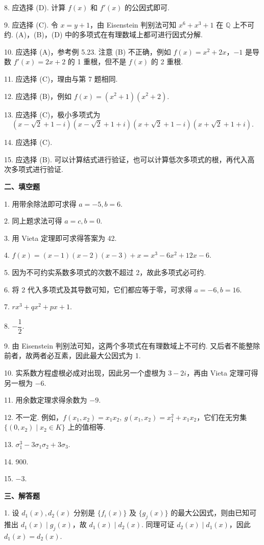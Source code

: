 \documentclass[UTF8,12pt,a4paper,fontset=fandol]{ctexart}
\begin{document}
8. 应选择 (D). 计算 $f(x)$ 和 $f'(x)$ 的公因式即可.

9. 应选择 (C). 令 $x=y+1$，由 Eisenstein 判别法可知 $x^6+x^3+1$ 在 $\mathbb{Q}$ 上不可约. (A)，(B)，(D) 中的多项式在有理数域上都可进行因式分解.

10. 应选择 (A)，参考例 5.23. 注意 (B) 不正确，例如 $f(x)=x^2+2x$，$-1$ 是导数 $f'(x)=2x+2$ 的 1 重根，但不是 $f(x)$ 的 2 重根.

11. 应选择 (C)，理由与第 7 题相同.

12. 应选择 (B)，例如 $f(x)=(x^2+1)(x^2+2)$.

13. 应选择 (C)，极小多项式为
\[
(x-\sqrt{2}+1-i)(x-\sqrt{2}+1+i)(x+\sqrt{2}+1-i)(x+\sqrt{2}+1+i).
\]

14. 应选择 (C).

15. 应选择 (B). 可以计算结式进行验证，也可以计算低次多项式的根，再代入高次多项式进行验证.

\noindent\textbf{二、填空题}

1. 用带余除法即可求得 $a=-5,b=6$.

2. 同上题求法可得 $a=c,b=0$.

3. 用 Vieta 定理即可求得答案为 42.

4. $f(x)=(x-1)(x-2)(x-3)+x=x^3-6x^2+12x-6$.

5. 因为不可约实系数多项式的次数不超过 2，故此多项式必可约.

6. 将 2 代入多项式及其导数可知，它们都应等于零，可求得 $a=-6,b=16$.

7. $rx^3+qx^2+px+1$.

8. $-\dfrac{1}{2}$.

9. 由 Eisenstein 判别法可知，这两个多项式在有理数域上不可约. 又后者不能整除前者，故两者必互素，因此最大公因式为 1.

10. 实系数方程虚根必成对出现，因此另一个虚根为 $3-2i$，再由 Vieta 定理可得另一根为 $-6$.

11. 用余数定理求得余数为 $-9$.

12. 不一定. 例如，$f(x_1,x_2)=x_1x_2,\ g(x_1,x_2)=x_1^2+x_1x_2$，它们在无穷集 $\{(0,x_2)\mid x_2\in K\}$ 上的值相等.

13. $\sigma_1^3-3\sigma_1\sigma_2+3\sigma_3$.

14. 900.

15. $-3$.

\noindent\textbf{三、解答题}

1. 设 $d_1(x),d_2(x)$ 分别是 $\{f_i(x)\}$ 及 $\{g_j(x)\}$ 的最大公因式，则由已知可推出 $d_1(x)\mid g_j(x)$，故 $d_1(x)\mid d_2(x)$. 同理可证 $d_2(x)\mid d_1(x)$，因此 $d_1(x)=d_2(x)$.
\end{document}

